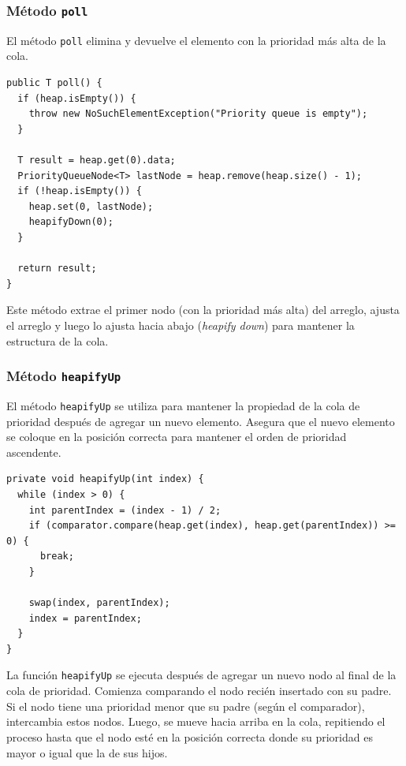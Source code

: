 \documentclass[10pt, a4paper]{article}
\newcommand{\mj}[1]{\texttt{#1}}
\begin{document}
\subsubsection{Método \mj{poll}}

El método \mj{poll} elimina y devuelve el elemento con la prioridad más alta de la cola.

\begin{verbatim}
public T poll() {
  if (heap.isEmpty()) {
    throw new NoSuchElementException("Priority queue is empty");
  }

  T result = heap.get(0).data;
  PriorityQueueNode<T> lastNode = heap.remove(heap.size() - 1);
  if (!heap.isEmpty()) {
    heap.set(0, lastNode);
    heapifyDown(0);
  }

  return result;
}
\end{verbatim}

Este método extrae el primer nodo (con la prioridad más alta) del arreglo, ajusta el arreglo y luego lo ajusta hacia abajo (\emph{heapify down}) para mantener la estructura de la cola.

\subsubsection{Método \mj{heapifyUp}}

El método \mj{heapifyUp} se utiliza para mantener la propiedad de la cola de prioridad después de agregar un nuevo elemento. Asegura que el nuevo elemento se coloque en la posición correcta para mantener el orden de prioridad ascendente.

\begin{verbatim}
private void heapifyUp(int index) {
  while (index > 0) {
    int parentIndex = (index - 1) / 2;
    if (comparator.compare(heap.get(index), heap.get(parentIndex)) >= 0) {
      break;
    }

    swap(index, parentIndex);
    index = parentIndex;
  }
}
\end{verbatim}

La función \mj{heapifyUp} se ejecuta después de agregar un nuevo nodo al final de la cola de prioridad. Comienza comparando el nodo recién insertado con su padre. Si el nodo tiene una prioridad menor que su padre (según el comparador), intercambia estos nodos. Luego, se mueve hacia arriba en la cola, repitiendo el proceso hasta que el nodo esté en la posición correcta donde su prioridad es mayor o igual que la de sus hijos.
\end{document}

